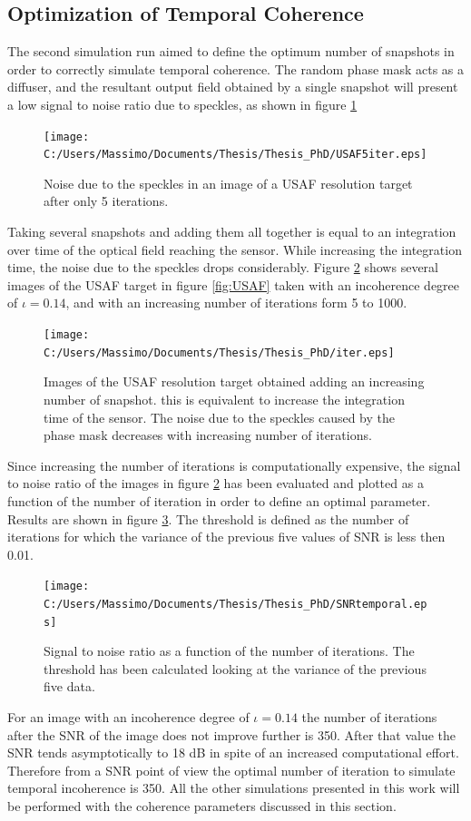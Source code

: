  \subsection{Optimization of Temporal Coherence}
The second simulation run aimed to define the optimum number of snapshots in order to correctly simulate temporal coherence. The random phase mask acts as a diffuser, and the resultant output field obtained by a single snapshot will present a low signal to noise ratio due to speckles, as shown in figure \ref{fig:speckle}
\begin{figure}[H]
	\centering
	\texttt{[image: C:/Users/Massimo/Documents/Thesis/Thesis\_PhD/USAF5iter.eps]}
	\caption{\label{fig:speckle}Noise due to the speckles in an image of a USAF resolution target after only 5 iterations.}
\end{figure}
Taking several snapshots and adding them all together is equal to an integration over time of the optical field reaching the sensor. While increasing the integration time, the noise due to the speckles drops considerably. Figure \ref{fig:iter} shows several images of the USAF target in figure \ref{fig:USAF} taken with an incoherence degree of $\iota=0.14$, and with an increasing number of iterations form 5 to 1000.
 \begin{figure}[H]
 	\centering
 	\texttt{[image: C:/Users/Massimo/Documents/Thesis/Thesis\_PhD/iter.eps]}
 	\caption{\label{fig:iter}Images of the USAF resolution target obtained adding an increasing number of snapshot. this is equivalent to increase the integration time of the sensor. The noise due to the speckles caused by the phase mask decreases with increasing number of iterations.}
 \end{figure}
 Since increasing the number of iterations is computationally expensive, the signal to noise ratio of the images in figure \ref{fig:iter} has been evaluated and plotted as a function of the number of iteration in order to define an optimal parameter. Results are shown in figure \ref{fig:SNRiter}. The threshold is defined as the number of iterations for which the variance of the previous five values of SNR is less then 0.01.
 \begin{figure}[H]
 	\centering
 	\texttt{[image: C:/Users/Massimo/Documents/Thesis/Thesis\_PhD/SNRtemporal.eps]}
 	\caption{\label{fig:SNRiter}Signal to noise ratio as a function of the number of iterations. The threshold has been calculated looking at the variance of the previous five data.}
 \end{figure}
 For an image with an incoherence degree of $\iota=0.14$ the number of iterations after the SNR of the image does not improve further is 350. After that value the SNR tends asymptotically to 18 dB in spite of an increased computational effort. Therefore from a SNR point of view the optimal number of iteration to simulate temporal incoherence is 350. All the other simulations presented in this work will be performed with the coherence parameters discussed in this section. 
